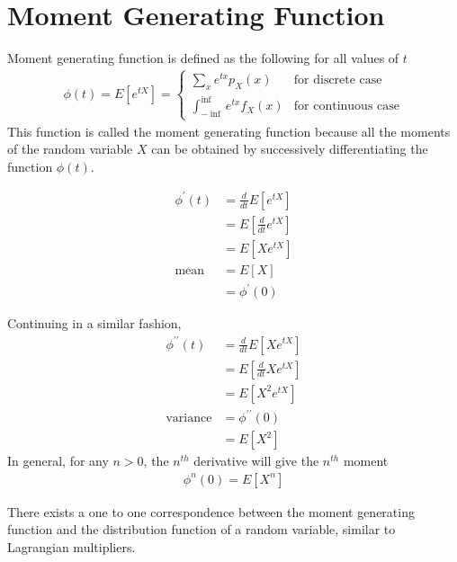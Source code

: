 \documentclass[../probability-notes.tex]{subfiles}
\begin{document}
    \section{Moment Generating Function}
    Moment generating function is defined as the following for all values of $t$
    \begin{align*}
        \phi (t) = E[e^{tX}] = \begin{cases} \sum_{x} e^{tx} p_{X}(x) &\mbox{for discrete case}\\
        \int_{-\inf}^{\inf} e^{tx} f_{X}(x) &\mbox{for continuous case} \end{cases} 
    \end{align*}
    This function is called the moment generating function because all the moments of the random variable $X$ can be obtained by successively differentiating the function $\phi(t)$.\newline

    \begin{align*}
        \phi^{\prime}(t) &= \frac{d}{dt} E[e^{tX}]\\
        &= E[\frac{d}{dt} e^{tX}]\\
        &= E[Xe^{tX}]\\
        \text{mean} &= E[X]\\ 
        &= \phi^{\prime}(0)
    \end{align*}

    Continuing in a similar fashion,
    \begin{align*}
        \phi^{\prime\prime}(t) &= \frac{d}{dt} E[Xe^{tX}]\\
        &= E[\frac{d}{dt}Xe^{tX}]\\
        &= E[X^{2}e^{tX}]\\
        \text{variance} &= \phi^{\prime\prime}(0)\\
        &= E[X^{2}]
    \end{align*}
    In general, for any $n > 0$, the $n^{th}$ derivative will give the $n^{th}$ moment
    \begin{align*}
        \phi^{n}(0) = E[X^{n}]
    \end{align*}

    There exists a one to one correspondence between the moment generating function and the distribution function of a random variable, similar to Lagrangian multipliers.

\end{document}
